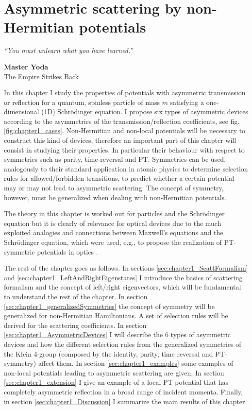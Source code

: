 
\chapter{Asymmetric scattering by non-Hermitian potentials}
\label{Chapter1}
%
\null
\textit{``You must unlearn what you have learned.''}
\begin{flushright}
  {\bf Master Yoda}\\
  The Empire Strikes Back
\end{flushright}
\null

In this chapter I study the properties of potentials with asymmetric transmission or reflection for a quantum, spinless particle of mass $m$ satisfying a one-dimensional (1D) Schr\"{o}dinger equation. I propose six types of asymmetric devices according to the asymmetries of the transmission/reflection coefficients, see fig. \ref{fig:chapter1_cases}. Non-Hermitian and non-local potentials will be necessary to construct this kind of devices, therefore an important part of this chapter will consist in studying their properties. In particular their behaviour with respect to symmetries such as parity, time-reversal and PT. Symmetries can be used, analogously to their standard application in atomic physics to determine selection rules for allowed/forbidden transitions, to predict whether a certain potential may or may not lead to asymmetric scattering. The concept of symmetry, however, must be generalized when dealing with non-Hermitian potentials.

The theory in this chapter is worked out for particles and the Schr\"odinger equation but it is clearly of relevance for optical devices
due to the much exploited analogies and connections between Maxwell's equations and the Schr\"odinger equation,
which were used, e.g., to propose  the realization of PT-symmetric potentials in optics \cite{Ruschhaupt2005}.

The rest of the chapter goes as follows. In sections \ref{sec:chapter1_ScattFormalism} and \ref{sec:chapter1_LeftAndRightEigenstates} I introduce the basics of scattering formalism and the concept of left/right eigenvectors, which will be fundamental to understand the rest of the chapter. In section \ref{sec:chapter1_generalizedSymmetries} the concept of symmetry will be generalized for non-Hermitian Hamiltonians. A set of selection rules will be derived for the scattering coefficients. In section \ref{sec:chapter1_AsymmetricDevices} I will describe the 6 types of asymmetric devices and how the different selection rules from the generalized symmetries of the Klein 4-group (composed by the identity, parity, time reversal and PT-symmetry) affect them. In section \ref{sec:chapter1_examples} some examples of non-local potentials leading to asymmetric scattering are given. In section \ref{sec:chapter1_extension} I give an example of a local PT potential that has completely asymmetric reflection in a broad range of incident momenta. Finally, in section \ref{sec:chapter1_Discussion} I summarize the main results of this chapter.

